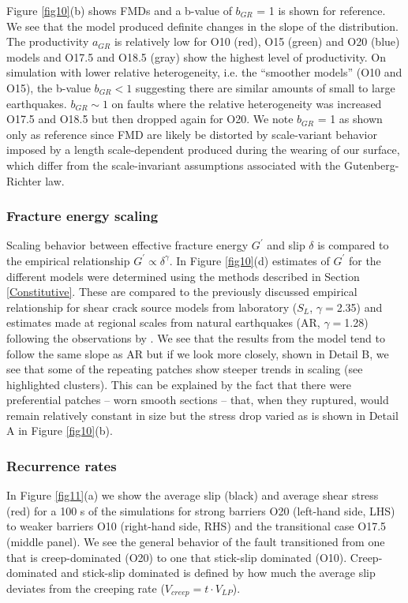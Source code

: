 \documentclass[preprint,1p, 10pt,authoryear]{elsarticle}
\begin{document}
Figure \ref{fig10}(b) shows FMDs and a b-value of $b_{GR}$ = 1 is shown for reference. We see that the model produced definite changes in the slope of the distribution.  The productivity $a_{GR}$  is relatively low for O10 (red), O15 (green) and O20 (blue) models and O17.5 and O18.5 (gray) show the highest level of productivity. On simulation with lower relative heterogeneity, i.e. the ``smoother models'' (O10 and O15), the b-value $b_{GR} < 1$ suggesting there are similar amounts of small to large earthquakes.  $b_{GR} \sim 1$ on faults where the relative heterogeneity was increased O17.5 and O18.5 but then dropped again for O20. We note $b_{GR}$ = 1 as shown only as reference since FMD are likely be distorted by scale-variant behavior \citep{Mignan2012} imposed by a length scale-dependent produced during the wearing of our surface, which differ from the scale-invariant assumptions associated with the Gutenberg-Richter law. 

\subsubsection{Fracture energy scaling}
\label{FracEnergy}
Scaling behavior between effective fracture energy $G^{'}$ and slip $\delta$  is compared to the  empirical relationship $G^{'} \propto \delta^{\gamma}$. In Figure \ref{fig10}(d) estimates of $G^{'}$ for the different models were determined using the methods described in Section \ref{Constitutive}. These are compared to the previously discussed empirical relationship for shear crack source models from laboratory ($S_{L}$, $\gamma = $2.35) \citep{Selvadurai2019}  and estimates made at regional scales from natural earthquakes (AR, $\gamma = $1.28) following the observations by \citet{Abercrombie2005}.  We see that the results from the model tend to follow the same slope as AR but if we look more closely, shown in Detail B, we see that some of the repeating patches show steeper trends in scaling (see highlighted clusters). This can be explained by the fact that there were preferential patches -- worn smooth sections -- that, when they ruptured, would remain relatively constant in size but the stress drop varied as is shown in Detail A in Figure \ref{fig10}(b).

\subsubsection{Recurrence rates}
\label{Recurrence times}
In Figure \ref{fig11}(a) we show the average slip (black) and average shear stress (red) for a 100 s of the simulations for strong barriers O20 (left-hand side, LHS) to weaker barriers O10 (right-hand side, RHS) and the transitional case O17.5 (middle panel).  We see the general behavior of the fault transitioned from one that is creep-dominated (O20) to one that stick-slip dominated (O10). Creep-dominated and stick-slip dominated is defined by how much the average slip deviates from the creeping rate ($V_{creep} = t\cdot V_{LP}$). 
\end{document}
